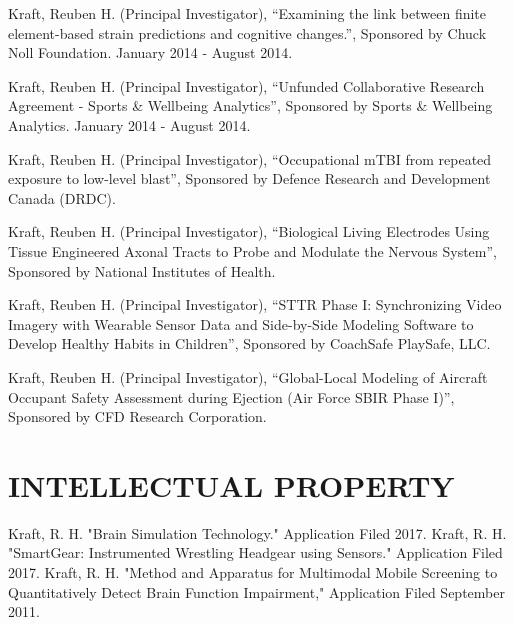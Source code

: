 \documentclass[a4paper,10pt]{article}
\begin{document}
\noindent Kraft, Reuben H. (Principal Investigator), ``Examining the link between finite element-based strain predictions and cognitive changes.'', Sponsored by Chuck Noll Foundation. January 2014 - August 2014.\vspace{0.25cm}

\noindent Kraft, Reuben H. (Principal Investigator), ``Unfunded Collaborative Research Agreement - Sports \& Wellbeing Analytics'', Sponsored by Sports \& Wellbeing Analytics. January 2014 - August 2014.\vspace{0.25cm}

\noindent Kraft, Reuben H. (Principal Investigator), ``Occupational mTBI from repeated exposure to low-level blast'', Sponsored by Defence Research and Development Canada (DRDC).\vspace{0.25cm}

\noindent Kraft, Reuben H. (Principal Investigator), ``Biological Living Electrodes Using Tissue Engineered Axonal Tracts to Probe and Modulate the Nervous System'', Sponsored by National Institutes of Health.\vspace{0.25cm}

\noindent Kraft, Reuben H. (Principal Investigator), ``STTR Phase I: Synchronizing Video Imagery with Wearable Sensor Data and Side-by-Side Modeling Software to Develop Healthy Habits in Children'', Sponsored by CoachSafe PlaySafe, LLC.\vspace{0.25cm}

\noindent Kraft, Reuben H. (Principal Investigator), ``Global-Local Modeling of Aircraft Occupant Safety Assessment during Ejection (Air Force SBIR Phase I)'', Sponsored by CFD Research Corporation.\vspace{0.25cm}



\section*{INTELLECTUAL PROPERTY}

\noindent Kraft, R. H. "Brain Simulation Technology." Application Filed 2017.\newline
\noindent Kraft, R. H. "SmartGear: Instrumented Wrestling Headgear using Sensors." Application Filed 2017.\newline
\noindent Kraft, R. H. "Method and Apparatus for Multimodal Mobile Screening to Quantitatively Detect Brain Function Impairment," Application Filed September 2011.\newline
\end{document}
